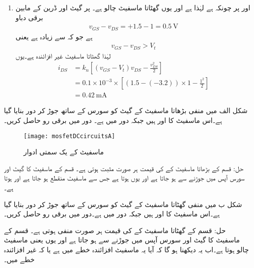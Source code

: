 \begin{enumerate}
\item
{} اور  	 پر چونکہ   ہے لہٰذا   ہے اور یوں گھٹاتا ماسفیٹ چالو ہے۔  پر گیٹ اور ڈرین کے مابین برقی دباو
\begin{align*}
v_{GS}-v_{DS}=+1.5-1=\SI{+0.5}{\volt}
\end{align*}
ہے جو کہ  سے زیادہ ہے یعنی
\begin{align*}
v_{GS}-v_{DS} > V_t
\end{align*}
لہٰذا گھٹاتا ماسفیٹ غیر افزائندہ ہے۔یوں
\begin{align*}
i_{DS}&=k_n \left[\left(v_{GS}-V_t \right )v_{DS}-\frac{v_{DS}^{2}}{2} \right ]\\
&=0.1 \times 10^{-3} \times \left[\left(1.5-(-3.2) \right ) \times  1 - \frac{1^2}{2} \right ]\\
&=\SI{0.42}{\milli \ampere}
\end{align*}

\end{enumerate}



شکل  الف میں منفی بڑھاتا ماسفیٹ کے گیٹ کو سورس کے ساتھ جوڑ کر دور بنایا گیا ہے۔اس ماسفیٹ کا    اور  ہیں جبکہ دور میں  ہے۔ دور میں برقی رو حاصل کریں۔
\begin{figure}
\centering
\texttt{[image: mosfetDCcircuitsA]}
\caption{ماسفیٹ کے یک سمتی ادوار}
\label{شکل_ماسفیٹ_کے_یک_سمتی_ادوار_الف}
\end{figure}

حل:  قسم کے بڑھاتا ماسفیٹ کے   کی قیمت ہر صورت مثبت ہوتی ہے۔  قسم کے ماسفیٹ کا گیٹ اور سورس آپس میں جوڑنے سے  ہو جاتا ہے اور یوں    ہوتا ہے جس سے ماسفیٹ منقطع ہو جاتا ہے اور    ہوتا ہے۔

شکل  ب میں منفی گھٹاتا ماسفیٹ کے گیٹ کو سورس کے ساتھ جوڑ کر دور بنایا گیا ہے۔اس ماسفیٹ کا  اور  ہیں  جبکہ دور میں   ہے۔دور میں برقی رو حاصل کریں۔

حل:  قسم کے گھٹاتا ماسفیٹ کے   کی قیمت ہر صورت منفی ہوتی ہے۔  قسم کے ماسفیٹ کا گیٹ اور سورس آپس میں جوڑنے سے    ہو جاتا ہے اور یوں   یعنی ماسفیٹ چالو ہوتا ہے۔اب یہ دیکھنا ہو گا کہ آیا یہ ماسفیٹ افزائندہ خطے میں ہے یا کہ غیر افزائندہ خطے میں۔

